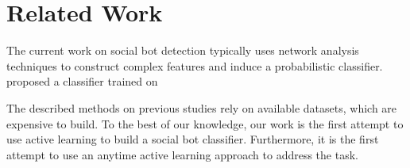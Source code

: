  
\section{Related Work}

The current work on social bot detection typically uses network analysis techniques to construct complex features and induce a probabilistic classifier. \cite{} proposed a classifier trained on 


The described methods on previous studies rely on available datasets, which are expensive to build. To the best of our knowledge, our work is the first attempt to use active learning to build a social bot classifier. Furthermore, it is the first attempt to use an anytime active learning approach to address the task. 